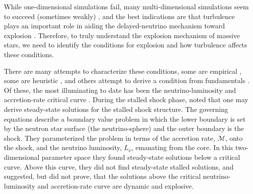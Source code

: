 \documentclass[twocolumn]{aastex6}
\begin{document}
While one-dimensional simulations fail, many multi-dimensional simulations
  seem to succeed (sometimes weakly) \citep{herant94,janka95,burrows95,janka96,burrows07b,melson15,dolence15,muller16,roberts16,bruenn16,burrows16}, and the best indications are that  turbulence plays an important role in aiding the delayed-neutrino
  mechanism toward explosion \citep{bethe85,janka96,marek09b,murphy13,murphy11}. Therefore, to truly understand the
  explosion mechanism of massive stars, we need to identify the
  conditions for explosion and how turbulence affects these
  conditions.

There are many attempts to characterize these conditions, some are
empirical \citep{oconnor11,ott13,ertl16}, some are
heuristic \citep{janka98,thompson00,thompson05,buras06,muller16b}, and others attempt
to derive a condition from fundamentals \citep{burrows93,pejcha12,murphy17}.  Of these, the most  illuminating to date has been the neutrino-luminosity and accretion-rate
  critical curve \citep{burrows93}.  During the stalled shock phase, \citet{burrows93} noted that
  one may derive steady-state solutions for the stalled shock
  structure.  The governing equations describe a boundary value
  problem in which the lower boundary is set by the neutron star
  surface (the neutrino-sphere) and the outer boundary is the shock.
  They parameterized the problem in terms of the accretion rate, $\dot{\mathcal{M}}$,
  onto the shock, and the neutrino luminosity, $L_\nu$, emanating from the
  core.  In this two-dimensional parameter space they found
  steady-state solutions below a critical curve.  Above this curve, they
did not find steady-state stalled solutions, and suggested, but did
not prove, that the solutions above the critical
neutrino-luminosity and accretion-rate curve are dynamic and explosive.

\end{document}
